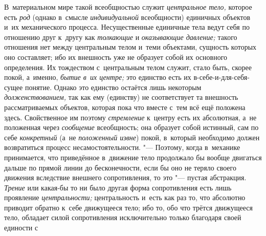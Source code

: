 В~материальном мире такой всеобщностью служит
{\em центральное тело,}
которое есть {\em род}
(однако в~смысле
{\em индивидуальной}
всеобщности) единичных объектов и~их механического процесса.
Несущественные единичные тела ведут себя по отношению друг к~другу как
{\em толкающие} и
{\em оказывающие давление;}
такого отношения нет между центральным телом и~теми
объектами, сущность которых оно составляет; ибо их внешность уже не
образует собой их основного определения. Их тождеством с~центральным телом
служит, стало быть, скорее покой, а~именно,
{\em бытие в~их центре;}
это единство есть их в-себе-и-для-себя-сущее понятие. Однако
это единство остаётся лишь некоторым
{\em долженствованием,}
так как ему (единству) не соответствует та внешность
рассматриваемых объектов, которая пока что вместе с~тем всё ещё положена
здесь. Свойственное им поэтому
{\em стремление} к~центру
есть их абсолютная, а~не положенная через
{\em сообщение}
всеобщность; она образует собой истинный, сам по себе
{\em конкретный} (а~не
{\em положенный извне})
покой, в~который необходимо должен возвратиться процесс
несамостоятельности. "--- Поэтому, когда в~механике
принимается, что приведённое в~движение тело продолжало бы вообще двигаться
дальше по прямой линии до бесконечности, если бы оно не теряло своего
движения вследствие внешнего сопротивления, то это "--- пустая
абстракция. {\em Трение}
или какая-бы то ни было другая форма
сопротивления есть лишь проявление
{\em центральности;}
центральность и~есть как раз то, что абсолютно приводит
обратно к~себе движущееся тело; ибо то, обо что трётся движущееся тело,
обладает силой сопротивления исключительно только благодаря своей единости
с
